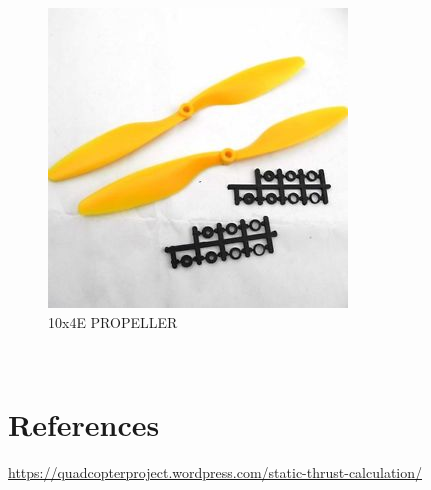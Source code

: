 \documentclass[11pt,a4paper]{article}
\begin{document}
		\begin{figure}[H]
			\centering
			\includegraphics[width = 400 px]{prop}
			\caption{10x4E PROPELLER}
		\end{figure}
	\\
	\section{References }
	\url{https://quadcopterproject.wordpress.com/static-thrust-calculation/}
\end{document}
